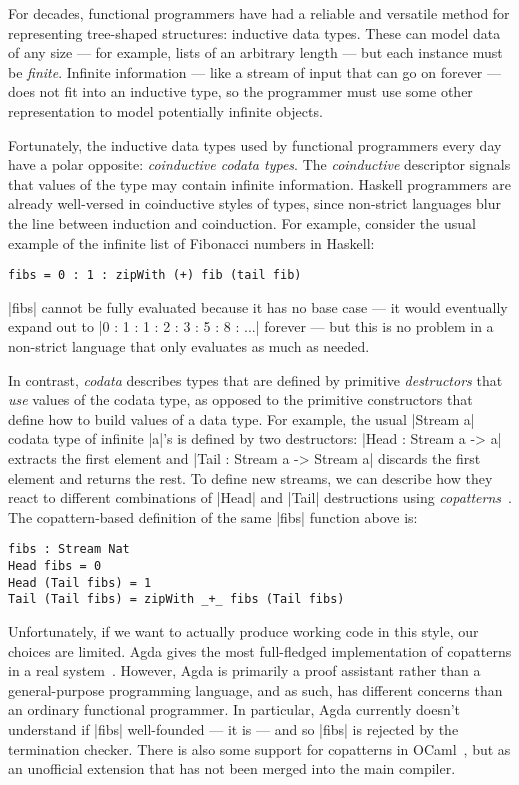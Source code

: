 For decades, functional programmers have had a reliable and versatile method for representing tree-shaped structures: inductive data types.
These can model data of any size --- for example, lists of an arbitrary length --- but each instance must be \emph{finite}.
Infinite information --- like a stream of input that can go on forever --- does not fit into an inductive type, so the programmer must use some other representation to model potentially infinite objects.

Fortunately, the inductive data types used by functional programmers every day have a polar opposite: \emph{coinductive codata types}.
The \emph{coinductive} descriptor signals that values of the type may contain infinite information.
Haskell programmers are already well-versed in coinductive styles of types, since non-strict languages blur the line between induction and coinduction.
For example, consider the usual example of the infinite list of Fibonacci numbers in Haskell:
\begin{verbatim}
fibs = 0 : 1 : zipWith (+) fib (tail fib)
\end{verbatim}
\hs|fibs| cannot be fully evaluated because it has no base case --- it would eventually expand out to \hs|0 : 1 : 1 : 2 : 3 : 5 : 8 : ...| forever --- but this is no problem in a non-strict language that only evaluates as much as needed.

In contrast, \emph{codata} describes types that are defined by primitive \emph{destructors} that \emph{use} values of the codata type, as opposed to the primitive constructors that define how to build values of a data type.
For example, the usual \agda|Stream a| codata type of infinite \agda|a|'s is defined by two destructors: \agda|Head : Stream a -> a| extracts the first element and \agda|Tail : Stream a -> Stream a| discards the first element and returns the rest.
To define new streams, we can describe how they react to different combinations of \agda|Head| and \agda|Tail| destructions using \emph{copatterns}~\cite{APTS2013C}.  The copattern-based definition of the same \agda|fibs| function above is:
\begin{verbatim}
fibs : Stream Nat
Head fibs = 0
Head (Tail fibs) = 1
Tail (Tail fibs) = zipWith _+_ fibs (Tail fibs)
\end{verbatim}
Unfortunately, if we want to actually produce working code in this style, our choices are limited.
Agda gives the most full-fledged implementation of copatterns in a real system~\cite{ElaboratingDependentCopatterns}.
However, Agda is primarily a proof assistant rather than a general-purpose programming language, and as such, has different concerns than an ordinary functional programmer.
In particular, Agda currently doesn't understand if \agda|fibs| well-founded --- it is --- and so \agda|fibs| is rejected by the termination checker.
There is also some support for copatterns in OCaml~\cite{LaforgueR17}, but as an unofficial extension that has not been merged into the main compiler.

